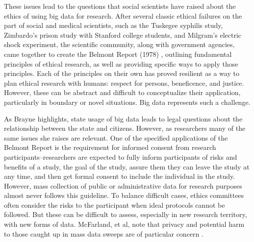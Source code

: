 \documentclass[sigconf]{acmart}
\begin{document}
These issues lead to the questions that social scientists have raised about the ethics of using big data for research.  After several classic ethical failures on the part of social and medical scientists, such as the Tuskegee syphilis study, Zimbardo's prison study with Stanford college students, and Milgram's electric shock experiment, the scientific community, along with government agencies, came together to create the Belmont Report (1978) \cite {fiske14}, outlining fundamental principles of ethical research, as well as providing specific ways to apply those principles.   Each of the principles on their own has proved resilient as a way to plan ethical research with humans: respect for persons, beneficence, and justice.  However, these can be abstract and difficult to conceptualize their application, particularly in boundary or novel situations.  Big data represents such a challenge.  

As Brayne highlights, state usage of big data leads to legal questions about the relationship between the state and citizens.  However, as researchers many of the same issues she raises are relevant.  One of the specified applications of the Belmont Report is the requirement for informed consent from research participants--researchers are expected to fully inform participants of risks and benefits of a study, the goal of the study, assure them they can leave the study at any time, and then get formal consent to include the individual in the study.  However, mass collection of public or administrative data for research purposes almost never follows this guideline.  To balance difficult cases, ethics committees often consider the risks to the participant when ideal protocols cannot be followed.  But these can be difficult to assess, especially in new research territory, with new forms of data.  McFarland, et al, note that privacy and potential harm to those caught up in mass data sweeps are of particular concern \cite {mcfarland16}.
\end{document}
